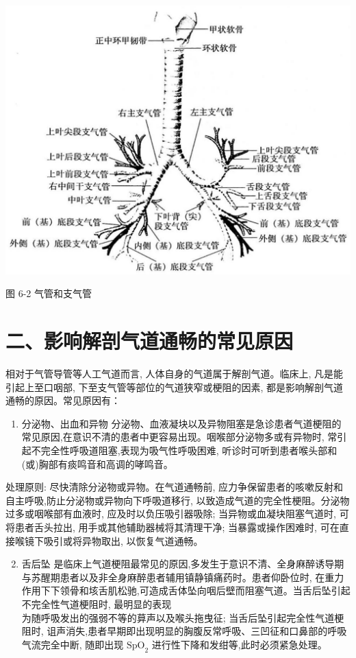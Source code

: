 \documentclass[10pt]{article}
\begin{document}
\begin{center}
\includegraphics[max width=\textwidth]{2024_07_09_002a177993bd97d1d6d7g-084}
\end{center}

图 6-2 气管和支气管

\section*{二、影响解剖气道通畅的常见原因}
相对于气管导管等人工气道而言, 人体自身的气道属于解剖气道。临床上, 凡是能引起上至口咽部, 下至支气管等部位的气道狭窄或梗阻的因素, 都是影响解剖气道通畅的原因。常见原因有：

\begin{enumerate}
  \item 分泌物、出血和异物 分泌物、血液凝块以及异物阻塞是急诊患者气道梗阻的常见原因,在意识不清的患者中更容易出现。咽喉部分泌物多或有异物时, 常引起不完全性呼吸道阻塞,表现为吸气性呼吸困难, 听诊时可听到患者喉头部和(或)胸部有痰鸣音和高调的哮鸣音。
\end{enumerate}

处理原则: 尽快清除分泌物或异物。在气道通畅前, 应力争保留患者的咳嗽反射和自主呼吸,防止分泌物或异物向下呼吸道移行, 以致造成气道的完全性梗阻。分泌物过多或咽喉部有血液时, 应及时以负压吸引器吸除; 当异物或血凝块阻塞气道时, 可将患者舌头拉出, 用手或其他辅助器械将其清理干净; 当暴露或操作困难时, 可在直接喉镜下吸引或将异物取出, 以恢复气道通畅。

\begin{enumerate}
  \setcounter{enumi}{1}
  \item 舌后坠 是临床上气道梗阻最常见的原因,多发生于意识不清、全身麻醉诱导期与苏醒期患者以及非全身麻醉患者辅用镇静镇痛药时。患者仰卧位时, 在重力作用下下领骨和垓舌肌松驰,可造成舌体坠向咽后壁而阻塞气道。当舌后坠引起不完全性气道梗阻时, 最明显的表现\\
为随呼吸发出的强弱不等的萛声以及喉头拖曳征; 当舌后坠引起完全性气道梗阻时, 诅声消失,患者早期即出现明显的胸腹反常呼吸、三凹征和口鼻部的呼吸气流完全中断, 随即出现 $\mathrm{SpO}_{2}$ 进行性下降和发绀等,此时必须紧急处理。
\end{enumerate}
\end{document}
